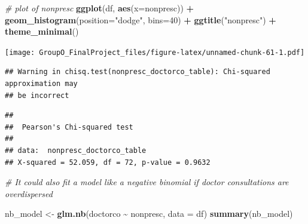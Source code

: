 \documentclass[
]{article}
\newenvironment{Shaded}{\begin{snugshade}}{\end{snugshade}}
\newcommand{\AttributeTok}[1]{\textcolor[rgb]{0.13,0.29,0.53}{#1}}
\newcommand{\CommentTok}[1]{\textcolor[rgb]{0.56,0.35,0.01}{\textit{#1}}}
\newcommand{\DecValTok}[1]{\textcolor[rgb]{0.00,0.00,0.81}{#1}}
\newcommand{\FunctionTok}[1]{\textcolor[rgb]{0.13,0.29,0.53}{\textbf{#1}}}
\newcommand{\NormalTok}[1]{#1}
\newcommand{\OtherTok}[1]{\textcolor[rgb]{0.56,0.35,0.01}{#1}}
\newcommand{\SpecialCharTok}[1]{\textcolor[rgb]{0.81,0.36,0.00}{\textbf{#1}}}
\newcommand{\StringTok}[1]{\textcolor[rgb]{0.31,0.60,0.02}{#1}}
\begin{document}
\begin{Shaded}
\begin{Highlighting}[]
\CommentTok{\# plot of nonpresc}
\FunctionTok{ggplot}\NormalTok{(df, }\FunctionTok{aes}\NormalTok{(}\AttributeTok{x=}\NormalTok{nonpresc)) }\SpecialCharTok{+}
  \FunctionTok{geom\_histogram}\NormalTok{(}\AttributeTok{position=}\StringTok{"dodge"}\NormalTok{, }\AttributeTok{bins=}\DecValTok{40}\NormalTok{) }\SpecialCharTok{+}
  \FunctionTok{ggtitle}\NormalTok{(}\StringTok{"nonpresc"}\NormalTok{) }\SpecialCharTok{+}
  \FunctionTok{theme\_minimal}\NormalTok{()}
\end{Highlighting}
\end{Shaded}

\texttt{[image: GroupO\_FinalProject\_files/figure-latex/unnamed-chunk-61-1.pdf]}

\begin{Shaded}
\end{Shaded}

\begin{verbatim}
## Warning in chisq.test(nonpresc_doctorco_table): Chi-squared approximation may
## be incorrect
\end{verbatim}

\begin{verbatim}
## 
##  Pearson's Chi-squared test
## 
## data:  nonpresc_doctorco_table
## X-squared = 52.059, df = 72, p-value = 0.9632
\end{verbatim}

\begin{Shaded}
\begin{Highlighting}[]
\CommentTok{\# It could also fit a model like a negative binomial if doctor consultations are overdispersed}

\NormalTok{nb\_model }\OtherTok{\textless{}{-}} \FunctionTok{glm.nb}\NormalTok{(doctorco }\SpecialCharTok{\textasciitilde{}}\NormalTok{ nonpresc, }\AttributeTok{data =}\NormalTok{ df)}
\FunctionTok{summary}\NormalTok{(nb\_model)}
\end{Highlighting}
\end{Shaded}
\end{document}
